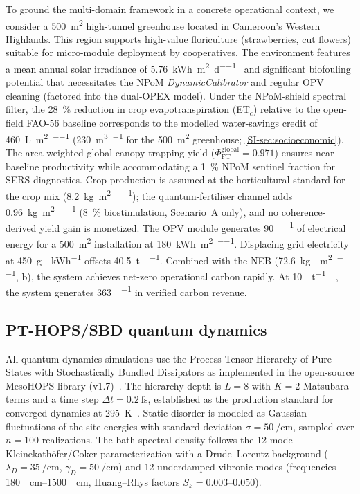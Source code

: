 \documentclass[12pt]{iopart}
\begin{document}
\begin{sloppypar}
To ground the multi-domain framework in a concrete operational context, we consider a \qty{500}{\m\squared} high-tunnel greenhouse located in Cameroon's Western Highlands. This region supports high-value floriculture (strawberries, cut flowers) suitable for micro-module deployment by cooperatives. The environment features a mean annual solar irradiance of \qty{5.76}{\kWh\per\m\squared\per\day}~\cite{FAO2022} and significant biofouling potential that necessitates the NPoM \textit{DynamicCalibrator} and regular OPV cleaning (factored into the dual-OPEX model). Under the NPoM-shield spectral filter, the \qty{28}{\percent} reduction in crop evapotranspiration (ET$_c$) relative to the open-field FAO-56 baseline corresponds to the modelled water-savings credit of \qty{460}{\L\per\m\squared\per\yr} (\qty{230}{\m\cubed\per\yr} for the \qty{500}{\m\squared} greenhouse; \cref{SI-sec:socioeconomic}). The area-weighted global canopy trapping yield ($\Phi_{\mathrm{FT}}^{\mathrm{global}} = 0.971$) ensures near-baseline productivity while accommodating a \qty{1}{\percent} NPoM sentinel fraction for SERS diagnostics. Crop production is assumed at the horticultural standard for the crop mix (\qty{8.2}{\kg\per\m\squared\per\yr}); the quantum-fertiliser channel adds \qty{0.96}{\kg\per\m\squared\per\yr} (\qty{8}{\percent} biostimulation, Scenario~A only), and no coherence-derived yield gain is monetized. The OPV module generates \qty{90}{\MWh\per\yr} of electrical energy for a \qty{500}{\m\squared} installation at \qty{180}{\kWh\per\m\squared\per\yr}. Displacing grid electricity at \qty{450}{\g{}\per\kWh} offsets \qty{40.5}{\tonne{}\per\yr}. Combined with the NEB (\qty{72.6}{\kg{}\per\m\squared\per\yr}, b), the system achieves net-zero operational carbon rapidly. At \qty{10}{\USD\per\tonne{}}~\cite{ICVCM2024}, the system generates \qty{363}{\USD\per\yr} in verified carbon revenue.
\end{sloppypar}

\subsection{PT-HOPS/SBD quantum dynamics}

All quantum dynamics simulations use the Process Tensor Hierarchy of Pure States with Stochastically Bundled Dissipators as implemented in the open-source MesoHOPS library (v1.7)~\cite{Varvelo2021}.
The hierarchy depth is $L = 8$ with $K = 2$ Matsubara terms and a time step $\Delta t = \qty{0.2}{\fs}$, established as the production standard for converged dynamics at \qty{295}{\kelvin}~\cite{Kouam2026}.
Static disorder is modeled as Gaussian fluctuations of the site energies with standard deviation $\sigma = \qty{50}{\per\cm}$, sampled over $n = 100$ realizations.
The bath spectral density follows the 12-mode Kleinekath\"{o}fer/Coker parameterization with a Drude--Lorentz background ($\lambda_D = \qty{35}{\per\cm}$, $\gamma_D = \qty{50}{\per\cm}$) and 12 underdamped vibronic modes (frequencies \qtyrange{180}{1500}{\per\cm}, Huang--Rhys factors $S_k = \numrange{0.003}{0.050}$).
\end{document}
